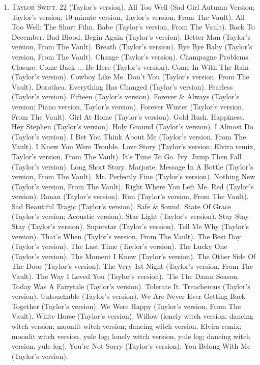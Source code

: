 \documentclass[oneside]{book}
\numberwithin{equation}{section}
\begin{document}
\begin{enumerate}
	\item \textsc{Taylor Swift.} 22 (Taylor's version). All Too Well (Sad Girl Autumn Version; Taylor's version; 10 minute version, Taylor's version, From The Vault). All Too Well: The Short Film. Babe (Taylor's version, From The Vault). Back To December. Bad Blood. Begin Again (Taylor's version). Better Man (Taylor's version, From The Vault). Breath (Taylor's version). Bye Bye Baby (Taylor's version, From The Vault). Change (Taylor's version). Champagne Problems. Closure. Come Back $\ldots$ Be Here (Taylor's version). Come In With The Rain (Taylor's version). Cowboy Like Me. Don't You (Taylor's version, From The Vault). Dorothea. Everything Has Changed (Taylor's version). Fearless (Taylor's version). Fifteen (Taylor's version). Forever \& Always (Taylor's version; Piano version, Taylor's version). Forever Winter (Taylor's version, From The Vault). Girl At Home (Taylor's version). Gold Rush. Happiness. Hey Stephen (Taylor's version). Holy Ground (Taylor's version). I Almost Do (Taylor's version). I Bet You Think About Me (Taylor's version, From The Vault). I Knew You Were Trouble. Love Story (Taylor's version; Elvira remix, Taylor's version, From The Vault). It's Time To Go. Ivy. Jump Then Fall (Taylor's version). Long Short Story. Marjorie. Message In A Bottle (Taylor's version, From The Vault). Mr. Perfectly Fine (Taylor's version). Nothing New (Taylor's version, From The Vault). Right Where You Left Me. Red (Taylor's version). Ronan (Taylor's version). Run (Taylor's version, From The Vault). Sad Beautiful Tragic (Taylor's version). Safe \& Sound. State Of Grace (Taylor's version; Acoustic version). Star Light (Taylor's version). Stay Stay Stay (Taylor's version). Superstar (Taylor's version). Tell Me Why (Taylor's version). That's When (Taylor's version, From The Vault). The Best Day (Taylor's version). The Last Time (Taylor's version). The Lucky One (Taylor's version). The Moment I Knew (Taylor's version). The Other Side Of The Door (Taylor's version). The Very 1st Night (Taylor's version, From The Vault). The Way I Loved You (Taylor's version). 'Tis The Damn Season. Today Was A Fairytale (Taylor's version). Tolerate It. Treacherous (Taylor's version). Untouchable (Taylor's version). We Are Never Ever Getting Back Together (Taylor's version). We Were Happy (Taylor's version, From The Vault). White Horse (Taylor's version). Willow (lonely witch version; dancing witch version; moonlit witch version; dancing witch version, Elvira remix; moonlit witch version, yule log; lonely witch version, yule log; dancing witch version, yule log). You're Not Sorry (Taylor's version). You Belong With Me (Taylor's version).

\end{enumerate}
\end{document}
